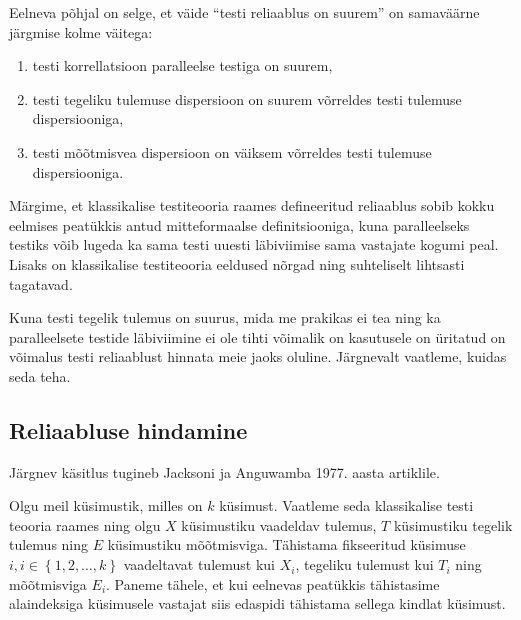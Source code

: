 \documentclass[a4paper,12pt]{article}
\numberwithin{equation}{section}
\theoremstyle{definition}
\begin{document}
Eelneva põhjal on selge, et väide  ``testi  reliaablus on suurem'' on samaväärne järgmise kolme väitega\cite[110]{Sijtsma2009}:
\begin{enumerate}
\item testi korrellatsioon paralleelse testiga on suurem,
\item testi tegeliku tulemuse dispersioon on suurem võrreldes testi tulemuse dispersiooniga,
\item testi mõõtmisvea dispersioon on väiksem võrreldes testi tulemuse dispersiooniga.
\end{enumerate}

Märgime, et klassikalise testiteooria raames defineeritud reliaablus sobib kokku eelmises peatükkis antud mitteformaalse definitsiooniga, kuna paralleelseks testiks võib lugeda ka sama testi uuesti läbiviimise sama vastajate kogumi peal. Lisaks on klassikalise testiteooria eeldused nõrgad ning suhteliselt lihtsasti tagatavad. 

Kuna testi tegelik tulemus on suurus, mida me prakikas ei tea ning ka paralleelsete testide läbiviimine ei ole tihti võimalik on kasutusele on üritatud on võimalus testi reliaablust hinnata meie jaoks oluline. Järgnevalt vaatleme, kuidas seda teha.



\subsection{Reliaabluse hindamine}

Järgnev käsitlus tugineb Jacksoni ja Anguwamba 1977. aasta artiklile.\cite{Jackson1977}

Olgu meil küsimustik, milles on $k$ k\"usimust. Vaatleme seda klassikalise testi teooria raames ning olgu $X$ küsimustiku vaadeldav tulemus, $T$ küsimustiku tegelik tulemus ning $E$ küsimustiku mõõtmisviga. Tähistama fikseeritud k\"usimuse $i, i \in \left\lbrace 1,2,\ldots,k \right\rbrace$ vaadeltavat tulemust kui $X_i$, tegeliku tulemust kui $T_i$ ning mõõtmisviga $E_i$. Paneme tähele, et kui eelnevas peatükkis tähistasime alaindeksiga küsimusele vastajat siis edaspidi tähistama sellega kindlat küsimust. 
\end{document}
